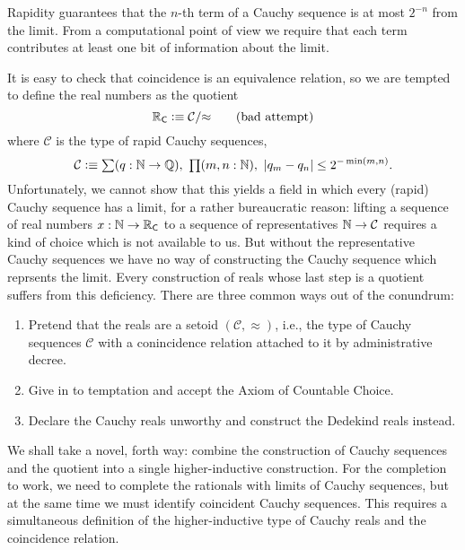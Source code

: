 \noindent
Rapidity guarantees that the $n$-th term of a Cauchy sequence is at most $2^{-n}$ from the
limit. From a computational point of view we require that each term contributes at least
one bit of information about the limit.

It is easy to check that coincidence is an equivalence relation, so we are tempted to
define the real numbers as the quotient
%
\[ \mathbb{R}_\mathsf{C} \vcentcolon\equiv \mathcal{C}/{\approx} \tag{bad attempt} \]
%
where $\mathcal{C}$ is the type of rapid Cauchy sequences,
%
\[ \mathcal{C} \defeq
   \sm{q : \N \to \Q} \prd{m,n:\N} |q_m - q_n| \leq 2^{-\min(m,n)}.
\]
%
Unfortunately, we cannot show that this yields a field in which every (rapid) Cauchy
sequence has a limit, for a rather bureaucratic reason: lifting a sequence of real numbers
$x : \mathbb{N} \to \mathbb{R}_\mathsf{C}$ to a sequence of representatives $\mathbb{N} \to \mathcal{C}$ requires a kind of
choice which is not available to us. But without the representative Cauchy sequences we
have no way of constructing the Cauchy sequence which reprsents the limit. Every
construction of reals whose last step is a quotient suffers from this deficiency. There
are three common ways out of the conundrum:
%
\begin{enumerate}
\item Pretend that the reals are a setoid $(\mathcal{C}, {\approx})$, i.e., the type of
  Cauchy sequences $\mathcal{C}$ with a conincidence relation attached to it by
  administrative decree.
\item Give in to temptation and accept the Axiom of Countable Choice.
\item Declare the Cauchy reals unworthy and construct the Dedekind reals instead.
\end{enumerate}
%
We shall take a novel, forth way: combine the construction of Cauchy sequences and the
quotient into a single higher-inductive construction. For the completion to work, we need
to complete the rationals with limits of Cauchy sequences, but at the same time we must
identify coincident Cauchy sequences. This requires a simultaneous definition of the
higher-inductive type of Cauchy reals and the coincidence relation.

